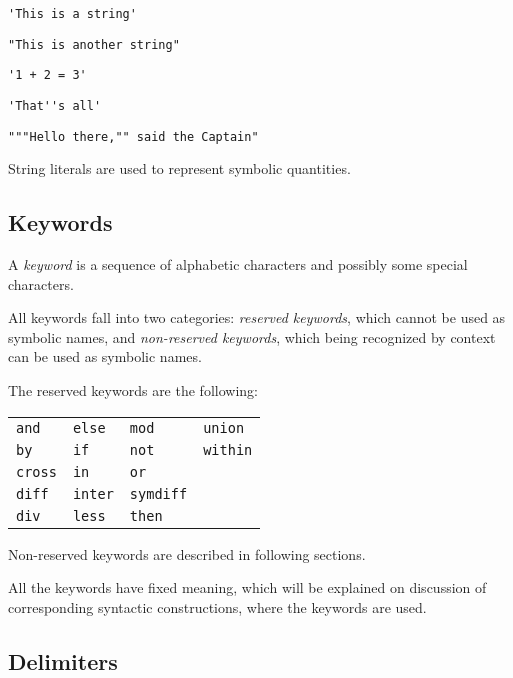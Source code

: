 \documentclass[10pt]{article}
\begin{document}
\medskip


\medskip

\noindent\verb|'This is a string'|

\noindent\verb|"This is another string"|

\noindent\verb|'1 + 2 = 3'|

\noindent\verb|'That''s all'|

\noindent\verb|"""Hello there,"" said the Captain"|

\medskip

String literals are used to represent symbolic quantities.

\subsection{Keywords}

A {\it keyword} is a sequence of alphabetic characters and possibly
some special characters.

All keywords fall into two categories: {\it reserved keywords}, which
cannot be used as symbolic names, and {\it non-reserved keywords},
which being recognized by context can be used as symbolic names.

\newpage

The reserved keywords are the following:

\medskip

\noindent\hfil
\begin{tabular}{@{}p{.7in}p{.7in}p{.7in}p{.7in}@{}}
{\tt and}&{\tt else}&{\tt mod}&{\tt union}\\
{\tt by}&{\tt if}&{\tt not}&{\tt within}\\
{\tt cross}&{\tt in}&{\tt or}\\
{\tt diff}&{\tt inter}&{\tt symdiff}\\
{\tt div}&{\tt less}&{\tt then}\\
\end{tabular}

\medskip

Non-reserved keywords are described in following sections.

All the keywords have fixed meaning, which will be explained on
discussion of corresponding syntactic constructions, where the keywords
are used.

\subsection{Delimiters}
\end{document}
